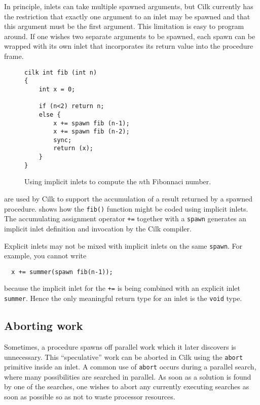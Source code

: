 In principle, inlets can take multiple spawned arguments, but Cilk
currently has the restriction that exactly one argument to an inlet
may be spawned and that this argument must be the first argument.
This limitation is easy to program around.  If one wishes two separate
arguments to be spawned, each spawn can be wrapped with its own inlet
that incorporates its return value into the procedure frame.

\begin{figure}[t]
\begin{center}
\begin{minipage}{.6\linewidth}
\small
\begin{verbatim}
cilk int fib (int n)
{
    int x = 0;

    if (n<2) return n;
    else {
        x += spawn fib (n-1);
        x += spawn fib (n-2);
        sync;
        return (x);
    }
}
\end{verbatim}
\end{minipage}
\end{center}
\caption{\small Using implicit inlets to compute the $n$th Fibonnaci number.}
\label{fig:implicit-inlet-fib}
\end{figure}

 are used by
Cilk to support the accumulation of a result returned by a spawned
procedure.   shows how the \texttt{fib()}
function might be coded using implicit inlets.  The accumulating
assignment operator \texttt{+=} together with a \texttt{spawn}
generates an implicit inlet definition and invocation by the Cilk
compiler.  

Explicit inlets may not be mixed with implicit inlets on the same \texttt{spawn}.  For example, you cannot write
\begin{verbatim}
  x += summer(spawn fib(n-1));
\end{verbatim}
because the implicit inlet for the \texttt{+=} is being combined with
an explicit inlet \texttt{summer}.  Hence the only meaningful return
type for an inlet is the \texttt{void} type.

\subsection{Aborting work}
\label{sec:abort}

Sometimes, a procedure spawns off parallel work which it later
discovers is unnecessary.  This ``speculative'' work can be aborted in
Cilk using the \texttt{abort} primitive inside an inlet.  A common use
of \texttt{abort} occurs during a parallel search, where many
possibilities are searched in parallel.  As soon as a solution is
found by one of the searches, one wishes to abort any currently
executing searches as soon as possible so as not to waste processor
resources.

